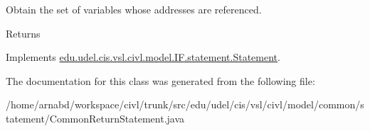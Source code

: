 Obtain the set of variables whose addresses are referenced. 

\begin{DoxyReturn}{Returns}

\end{DoxyReturn}


Implements \hyperlink{interfaceedu_1_1udel_1_1cis_1_1vsl_1_1civl_1_1model_1_1IF_1_1statement_1_1Statement_abe668e1bcb4297c9e6e7f8f65aeecfc2}{edu.\+udel.\+cis.\+vsl.\+civl.\+model.\+I\+F.\+statement.\+Statement}.



The documentation for this class was generated from the following file\+:\begin{DoxyCompactItemize}
\item 
/home/arnabd/workspace/civl/trunk/src/edu/udel/cis/vsl/civl/model/common/statement/Common\+Return\+Statement.\+java\end{DoxyCompactItemize}
